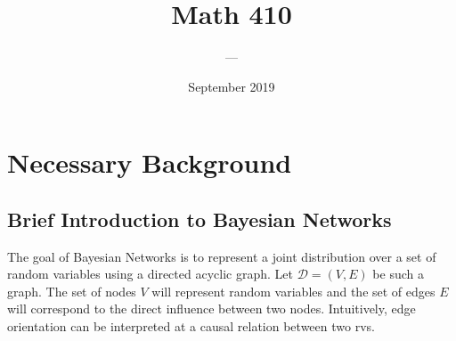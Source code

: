 \documentclass[12pt]{article}
\title{Math 410}
\author{--- }
\date{September 2019}
\theoremstyle{definition}
\theoremstyle{definition}
\begin{document}
\maketitle
\tableofcontents{}
\pagebreak

\section{Necessary Background }

\subsection{Brief Introduction to Bayesian Networks}
The goal of Bayesian Networks is to represent a joint distribution over a set of random variables using a directed acyclic graph. Let $\mathcal{D}=(V,E)$ be such a graph. The set of nodes $V$ will represent random variables and the set of edges $E$ will correspond to the direct influence between two nodes. Intuitively, edge orientation can be interpreted at a causal relation between two rvs.
\end{document}
